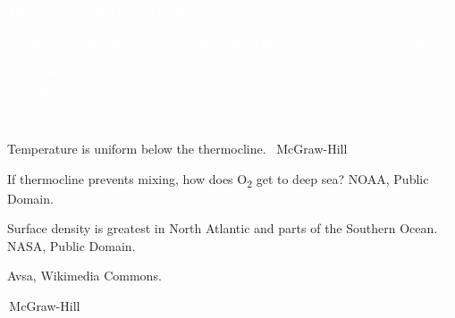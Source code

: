 \documentclass[t]{beamer}
\begin{document}

{
\begin{frame}[t]{\textcolor{white}{The \textcolor{orange5}{deep sea} is the largest habitat on Earth.}}
\end{frame}}

{
\begin{frame}[t]{\textcolor{white}{List the environmental parameters that affect the biology of deep-sea organisms.}}

\hangpara\parbox{0.45\textwidth}{\raggedright\textcolor{white}{Then, pick one that you think most affects the deep-sea community interactions and explain why.}}

\hangpara\parbox{0.45\textwidth}{\textcolor{white}{Do this for both the mesopelagic and the bathypelagic communities.}}

\end{frame}}

{
\begin{frame}[b]{Temperature is uniform below the thermocline.}
\tiny\textcopyright\, McGraw-Hill
\end{frame}}

{
\begin{frame}[b]{If thermocline prevents mixing, how does O\textsubscript{2} get to deep sea?}
\tiny NOAA, Public Domain.
\end{frame}}

{
\begin{frame}[b]{Surface density is greatest in North Atlantic and parts of the Southern Ocean.}
\tiny NASA, Public Domain.
\end{frame}}


{
\begin{frame}[b]
\tiny Avsa, Wikimedia Commons.
\end{frame}}


{
\begin{frame}[b]
\tiny\textcopyright\,McGraw-Hill
\end{frame}}
\end{document}
